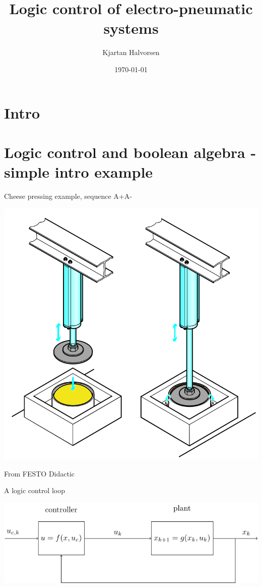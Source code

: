 \documentclass[presentation,aspectratio=1610]{beamer}
\author{Kjartan Halvorsen}
\date{\today}
\title{Logic control of electro-pneumatic systems}
\begin{document}
\maketitle

\section{Intro}
\label{sec:orge60d4be}


\section{Logic control and boolean algebra - simple intro example}
\label{sec:orgbd55af7}
\begin{frame}[label={sec:org7c854ce}]{Cheese pressing example, sequence A+A-}
\begin{center}
\includegraphics[width=0.5\linewidth]{../../figures/cheese-stamping.png}
\end{center}
{\tiny From FESTO Didactic}
\end{frame}

\begin{frame}[label={sec:org330cfec}]{A logic control loop}
\begin{center}
\includegraphics[width=\linewidth]{../../figures/logic-control-loop}
\end{center}
\end{frame}
\end{document}
